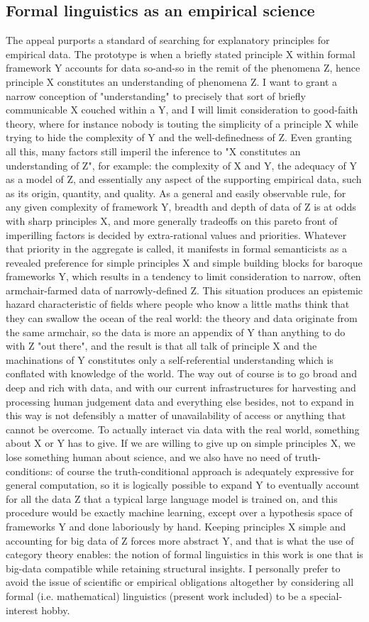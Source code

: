 \subsection{Formal linguistics as an empirical science}
The appeal purports a standard of searching for explanatory principles for empirical data. The prototype is when a briefly stated principle X within formal framework Y accounts for data so-and-so in the remit of the phenomena Z, hence principle X constitutes an understanding of phenomena Z. I want to grant a narrow conception of "understanding" to precisely that sort of briefly communicable X couched within a Y, and I will limit consideration to good-faith theory, where for instance nobody is touting the simplicity of a principle X while trying to hide the complexity of Y and the well-definedness of Z. Even granting all this, many factors still imperil the inference to "X constitutes an understanding of Z", for example: the complexity of X and Y, the adequacy of Y as a model of Z, and essentially any aspect of the supporting empirical data, such as its origin, quantity, and quality. As a general and easily observable rule, for any given complexity of framework Y, breadth and depth of data of Z is at odds with sharp principles X, and more generally tradeoffs on this pareto front of imperilling factors is decided by extra-rational values and priorities. Whatever that priority in the aggregate is called, it manifests in formal semanticists as a revealed preference for simple principles X and simple building blocks for baroque frameworks Y, which results in a tendency to limit consideration to narrow, often armchair-farmed data of narrowly-defined Z. This situation produces an epistemic hazard characteristic of fields where people who know a little maths think that they can swallow the ocean of the real world: the theory and data originate from the same armchair, so the data is more an appendix of Y than anything to do with Z "out there", and the result is that all talk of principle X and the machinations of Y constitutes only a self-referential understanding which is conflated with knowledge of the world. The way out of course is to go broad and deep and rich with data, and with our current infrastructures for harvesting and processing human judgement data and everything else besides, not to expand in this way is not defensibly a matter of unavailability of access or anything that cannot be overcome. To actually interact via data with the real world, something about X or Y has to give. If we are willing to give up on simple principles X, we lose something human about science, and we also have no need of truth-conditions: of course the truth-conditional approach is adequately expressive for general computation, so it is logically possible to expand Y to eventually account for all the data Z that a typical large language model is trained on, and this procedure would be exactly machine learning, except over a hypothesis space of frameworks Y and done laboriously by hand. Keeping principles X simple and accounting for big data of Z forces more abstract Y, and that is what the use of category theory enables: the notion of formal linguistics in this work is one that is big-data compatible while retaining structural insights. I personally prefer to avoid the issue of scientific or empirical obligations altogether by considering all formal (i.e. mathematical) linguistics (present work included) to be a special-interest hobby.